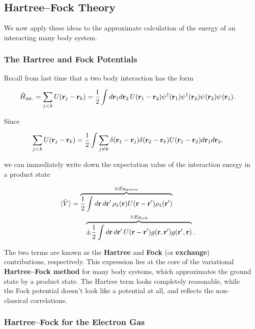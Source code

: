 \hypertarget{hartreefock-theory}{%
\subsection{Hartree--Fock Theory}\label{hartreefock-theory}}

We now apply these ideas to the approximate calculation of the energy of
an interacting many body system.

\hypertarget{the-hartree-and-fock-potentials}{%
\subsubsection{The Hartree and Fock
Potentials}\label{the-hartree-and-fock-potentials}}

Recall from last time that a two body interaction has the form

\[
\hat H_\text{int.} = \sum_{j<k} U(\br_j-\br_k)=\frac{1}{2}\int d\br_1 d\br_2\, U(\br_1-\br_2)\pdop(\br_1)\pdop(\br_2)\pop(\br_2)\pop(\br_1).
\]

Since

\[
\sum_{j<k} U(\mathbf{r}_j-\mathbf{r}_k) = \frac{1}{2}\int \sum_{j\neq k}\delta(\mathbf{r}_1-\mathbf{r}_j)\delta(\mathbf{r}_2-\mathbf{r}_k)U(\mathbf{r}_1-\mathbf{r}_2) d\mathbf{r}_1 d\mathbf{r}_2,
\]

we can immediately write down the expectation value of the interaction
energy in a product state

\[
\begin{align}
    \label{2nd_quant_HartreeFock}
    \langle \hat V\rangle &= \overbrace{\frac{1}{2}\int d\mathbf{r}\, d\mathbf{r}'\, \rho_1(\mathbf{r}) U(\mathbf{r}-\mathbf{r}')\rho_1(\mathbf{r}')}^{\equiv E_\text{Hartree}} \nonumber\\
    &\qquad\overbrace{\pm \frac{1}{2}\int d\mathbf{r}\, d\mathbf{r}'\,  U(\mathbf{r}-\mathbf{r}')g(\mathbf{r},\mathbf{r}')g(\mathbf{r}',\mathbf{r})}^{\equiv E_\text{Fock}}.
\end{align}
\]

The two terms are known as the \textbf{Hartree} and \textbf{Fock} (or
\textbf{exchange}) contributions, respectively. This expression lies at
the core of the variational \textbf{Hartree--Fock method} for many body
systems, which approximates the ground state by a product state. The
Hartree term looks completely reasonable, while the Fock potential
doesn't look like a potential at all, and reflects the non-classical
correlations.

\hypertarget{hartreefock-for-the-electron-gas}{%
\subsubsection{Hartree--Fock for the Electron
Gas}\label{hartreefock-for-the-electron-gas}}

